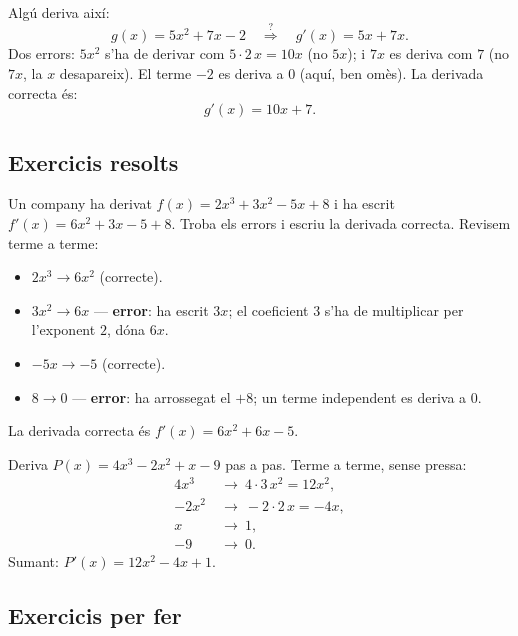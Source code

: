 \begin{exemple}
Algú deriva així:
\[
g(x)=5x^2+7x-2 \quad\overset{?}{\Longrightarrow}\quad g'(x)=5x+7x.
\]
Dos errors: $5x^2$ s'ha de derivar com $5\cdot 2\,x=10x$ (no $5x$); i $7x$ es deriva
com $7$ (no $7x$, la $x$ desapareix). El terme $-2$ es deriva a $0$ (aquí, ben omès).
La derivada correcta és:
\[
g'(x)=10x+7.
\]
\end{exemple}

\subsection{Exercicis resolts}

\begin{exresolt}
Un company ha derivat $f(x)=2x^3+3x^2-5x+8$ i ha escrit
$f'(x)=6x^2+3x-5+8$. Troba els errors i escriu la derivada correcta.
\solucio
Revisem terme a terme:
\begin{itemize}[leftmargin=1.4em, itemsep=2pt]
  \item $2x^3\to 6x^2$ \checkmark (correcte).
  \item $3x^2\to 6x$ — \textbf{error}: ha escrit $3x$; el coeficient $3$ s'ha de
        multiplicar per l'exponent $2$, dóna $6x$.
  \item $-5x\to -5$ \checkmark (correcte).
  \item $8\to 0$ — \textbf{error}: ha arrossegat el $+8$; un terme independent es
        deriva a $0$.
\end{itemize}
La derivada correcta és $f'(x)=6x^2+6x-5$.
\end{exresolt}

\begin{exresolt}
Deriva $P(x)=4x^3-2x^2+x-9$ pas a pas.
\solucio
Terme a terme, sense pressa:
\begin{align*}
4x^3 &\ \to\ 4\cdot 3\,x^2=12x^2,\\
-2x^2 &\ \to\ -2\cdot 2\,x=-4x,\\
x &\ \to\ 1,\\
-9 &\ \to\ 0.
\end{align*}
Sumant: $P'(x)=12x^2-4x+1$.
\end{exresolt}

\subsection{Exercicis per fer}

